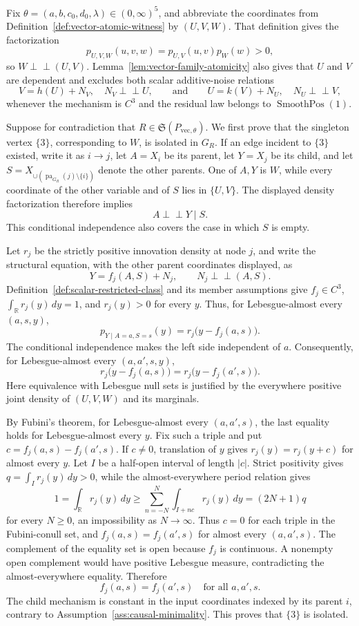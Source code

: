 Fix \(\theta=(a,b,c_0,d_0,\lambda)\in(0,\infty)^5\), and abbreviate the coordinates from Definition~\ref{def:vector-atomic-witness} by \((U,V,W)\).  That definition gives the factorization
\[
 p_{U,V,W}(u,v,w)=p_{U,V}(u,v)p_W(w)>0,
\]
so \(W\perp\!\!\!\perp(U,V)\).  Lemma~\ref{lem:vector-family-atomicity} also gives that \(U\) and \(V\) are dependent and excludes both scalar additive-noise relations
\[
 V=h(U)+N_V,\quad N_V\perp\!\!\!\perp U,
 \qquad\text{and}\qquad
 U=k(V)+N_U,\quad N_U\perp\!\!\!\perp V,
\]
whenever the mechanism is \(C^3\) and the residual law belongs to \(\operatorname{SmoothPos}(1)\).

Suppose for contradiction that \(R\in\mathfrak S(P_{\mathrm{vec},\theta})\).  We first prove that the singleton vertex \(\{3\}\), corresponding to \(W\), is isolated in \(G_R\).  If an edge incident to \(\{3\}\) existed, write it as \(i\to j\), let \(A=X_i\) be its parent, let \(Y=X_j\) be its child, and let \(S=X_{\cup(\operatorname{pa}_{G_R}(j)\setminus\{i\})}\) denote the other parents.  One of \(A,Y\) is \(W\), while every coordinate of the other variable and of \(S\) lies in \(\{U,V\}\).  The displayed density factorization therefore implies
\[
 A\perp\!\!\!\perp Y\mid S.
\]
This conditional independence also covers the case in which \(S\) is empty.

Let \(r_j\) be the strictly positive innovation density at node \(j\), and write the structural equation, with the other parent coordinates displayed, as
\[
 Y=f_j(A,S)+N_j,
 \qquad N_j\perp\!\!\!\perp(A,S).
\]
Definition~\ref{def:scalar-restricted-class} and its member assumptions give \(f_j\in C^3\), \(\int_{\mathbb R}r_j(y)\,dy=1\), and \(r_j(y)>0\) for every \(y\).  Thus, for Lebesgue-almost every \((a,s,y)\),
\[
 p_{Y\mid A=a,S=s}(y)=r_j\bigl(y-f_j(a,s)\bigr).
\]
The conditional independence makes the left side independent of \(a\).  Consequently, for Lebesgue-almost every \((a,a',s,y)\),
\[
 r_j\bigl(y-f_j(a,s)\bigr)
 =r_j\bigl(y-f_j(a',s)\bigr).
\]
Here equivalence with Lebesgue null sets is justified by the everywhere positive joint density of \((U,V,W)\) and its marginals.

By Fubini's theorem, for Lebesgue-almost every \((a,a',s)\), the last equality holds for Lebesgue-almost every \(y\).  Fix such a triple and put \(c=f_j(a,s)-f_j(a',s)\).  If \(c\ne0\), translation of \(y\) gives \(r_j(y)=r_j(y+c)\) for almost every \(y\).  Let \(I\) be a half-open interval of length \(|c|\).  Strict positivity gives \(q=\int_I r_j(y)\,dy>0\), while the almost-everywhere period relation gives
\[
 1=\int_{\mathbb R}r_j(y)\,dy
 \ge \sum_{n=-N}^{N}\int_{I+nc}r_j(y)\,dy
 =(2N+1)q
\]
for every \(N\ge0\), an impossibility as \(N\to\infty\).  Thus \(c=0\) for each triple in the Fubini-conull set, and \(f_j(a,s)=f_j(a',s)\) for almost every \((a,a',s)\).  The complement of the equality set is open because \(f_j\) is continuous.  A nonempty open complement would have positive Lebesgue measure, contradicting the almost-everywhere equality.  Therefore
\[
 f_j(a,s)=f_j(a',s)\quad\text{for all }a,a',s.
\]
The child mechanism is constant in the input coordinates indexed by its parent \(i\), contrary to Assumption~\ref{ass:causal-minimality}.  This proves that \(\{3\}\) is isolated.

